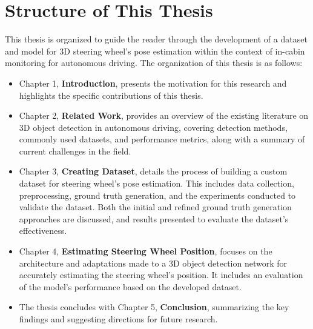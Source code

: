 \section{Structure of This Thesis}
This thesis is organized to guide the reader through the development of a dataset and model for 3D steering wheel's pose estimation within the context of in-cabin monitoring for autonomous driving. The organization of this thesis is as follows:
\begin{itemize}
    \item Chapter 1, \textbf{Introduction}, presents the motivation for this research and highlights the specific contributions of this thesis. 
    \item Chapter 2, \textbf{Related Work}, provides an overview of the existing literature on 3D object detection in autonomous driving, covering detection methods, commonly used datasets, and performance metrics, along with a summary of current challenges in the field.
    \item Chapter 3, \textbf{Creating Dataset}, details the process of building a custom dataset for steering wheel's pose estimation. This includes data collection, preprocessing, ground truth generation, and the experiments conducted to validate the dataset. Both the initial and refined ground truth generation approaches are discussed, and results presented to evaluate the dataset’s effectiveness.
    \item Chapter 4, \textbf{Estimating Steering Wheel Position}, focuses on the architecture and adaptations made to a 3D object detection network for accurately estimating the steering wheel's position. It includes an evaluation of the model’s performance based on the developed dataset.
    \item The thesis concludes with Chapter 5, \textbf{Conclusion}, summarizing the key findings and suggesting directions for future research.
\end{itemize}



